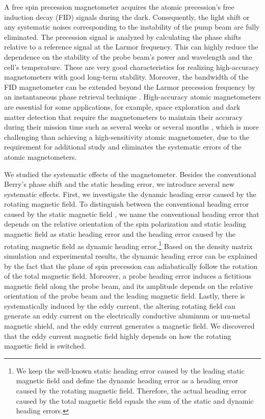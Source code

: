 \documentclass[prx,twocolumn,10pt,nofootinbib]{revtex4-1}
\begin{document}
 A free spin precession magnetometer acquires the atomic precession's free induction decay (FID) signals during the dark. Consequently, the light shift or any systematic noises corresponding to the instability of the pump beam are fully eliminated. The precession signal is analyzed by calculating the phase shifts relative to a reference signal at the Larmor frequency. This can highly reduce the dependence on the stability of the probe beam's power and wavelength and the cell's temperature. These are very good characteristics for realizing high-accuracy magnetometers with good long-term stability. Moreover, the bandwidth of the FID magnetometer can be extended beyond the Larmor precession frequency by an instantaneous phase retrieval technique \cite{wilson2020wide}. High-accuracy atomic magnetometers are essential for some applications, for example, space exploration and dark matter detection that require the magnetometers to maintain their accuracy during their mission time such as several weeks or several months \cite{anderson2007magnetometer, afach2021search, afach2018characterization}, which is more challenging than achieving a high-sensitivity atomic magnetometer, due to the requirement for additional study and eliminates the systematic errors of the atomic magnetometers. 

We studied the systematic effects of the magnetometer. Besides the conventional Berry's phase shift and the static heading error, we introduce several new systematic effects. First, we investigate the dynamic heading error caused by the rotating magnetic field. To distinguish between the conventional heading error caused by the static magnetic field \cite{oelsner2019sources,lee2021heading}, we name the conventional heading error that depends on the relative orientation of the spin polarization and static leading magnetic field as static heading error and the heading error caused by the rotating magnetic field as dynamic heading error.\footnote{We keep the well-known static heading error caused by the leading static magnetic field and define the dynamic heading error as a heading error caused by the rotating magnetic field. Therefore, the actual heading error caused by the total magnetic field equals the sum of the static and dynamic heading errors.} Based on the density matrix simulation and experimental results, the dynamic heading error can be explained by the fact that the plane of spin precession can adiabatically follow the rotation of the total magnetic field. Moreover, a probe heading error induces a fictitious magnetic field along the probe beam, and its amplitude depends on the relative orientation of the probe beam and the leading magnetic field. Lastly, there is systematically induced by the eddy current, the altering rotating field can generate an eddy current on the electrically conductive aluminum or mu-metal magnetic shield, and the eddy current generates a magnetic field. We discovered that the eddy current magnetic field highly depends on how the rotating magnetic field is switched.
\end{document}
